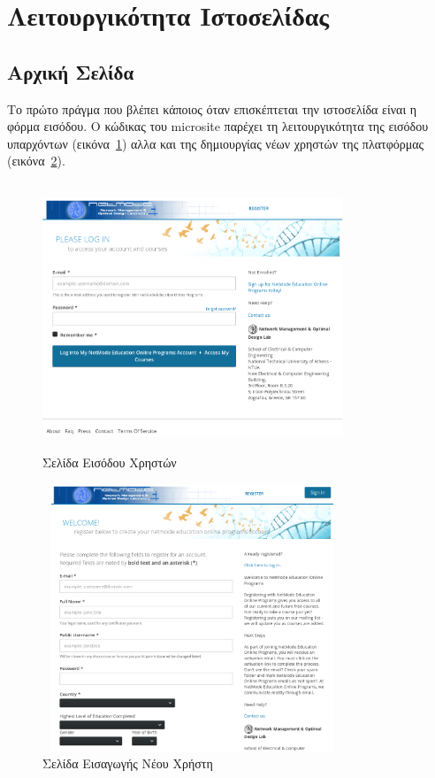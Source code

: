 \documentclass[12pt]{report}
\begin{document}
\section{Λειτουργικότητα Ιστοσελίδας}\label{lms_use}
\subsection{Αρχική Σελίδα}
Το πρώτο πράγμα που βλέπει κάποιος όταν επισκέπτεται την ιστοσελίδα είναι η φόρμα εισόδου. Ο κώδικας του \textlatin{microsite} παρέχει τη λειτουργικότητα της εισόδου υπαρχόντων (εικόνα~\ref{fig:microsite_login}) αλλα και της δημιουργίας νέων χρηστών της πλατφόρμας (εικόνα~\ref{fig:microsite_register}).

\begin{figure}[!htbp]
\centering
\includegraphics[width=0.8\textwidth, height=8cm]{microsite-login}
\caption{Σελίδα Εισόδου Χρηστών}
\label{fig:microsite_login}
\end{figure}

\begin{figure}[!htbp]
\centering
\includegraphics[width=0.8\textwidth, height=8cm]{microsite-register}
\caption{Σελίδα Εισαγωγής Νέου Χρήστη}
\label{fig:microsite_register}
\end{figure}
\end{document}
